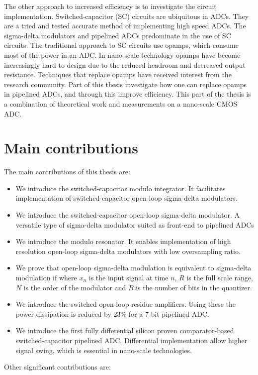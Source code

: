 The other approach to increased efficiency is to investigate the
circuit implementation. 
Switched-capacitor (SC) circuits are ubiquitous in ADCs. They are a tried
and tested accurate method of implementing  high speed
ADCs. The sigma-delta modulators and pipelined ADCs predominate in
the use of SC circuits. The traditional approach to SC  circuits use
opamps, which consume most of the
power in an ADC. In nano-scale technology opamps have become
increasingly hard to design due to the reduced headroom and decreased
output resistance. Techniques that replace opamps have received
interest from the research community. Part of this thesis investigate
how one can replace opamps in pipelined ADCs, and through
this improve efficiency. This part of the thesis is a combination of
theoretical work and measurements on a nano-scale CMOS ADC. 


\section{Main contributions}
The main contributions of this thesis are:


\begin{itemize}
\item We introduce the switched-capacitor modulo integrator. It facilitates
  implementation of switched-capacitor open-loop sigma-delta
  modulators.
\item We introduce the switched-capacitor open-loop sigma-delta
  modulator. A versatile type of sigma-delta modulator suited as
  front-end to pipelined ADCs
\item We introduce the modulo resonator. It enables implementation of high
  resolution open-loop sigma-delta modulators with low oversampling ratio.
\item We prove that open-loop sigma-delta modulation is equivalent to
  sigma-delta modulation if
where $x_n$ is the input signal at time $n$, $R$ is the full scale
range, $N$ is the order of the modulator and $B$ is the number of bits in
the quantizer.
\item We introduce the switched open-loop residue amplifiers. Using these the power
  dissipation is reduced by 23\% for a  7-bit pipelined ADC.
\item We introduce the first fully differential silicon proven comparator-based
  switched-capacitor pipelined ADC. Differential implementation allow
  higher signal swing, which is essential
  in nano-scale technologies.

\end{itemize}
Other significant contributions are:

